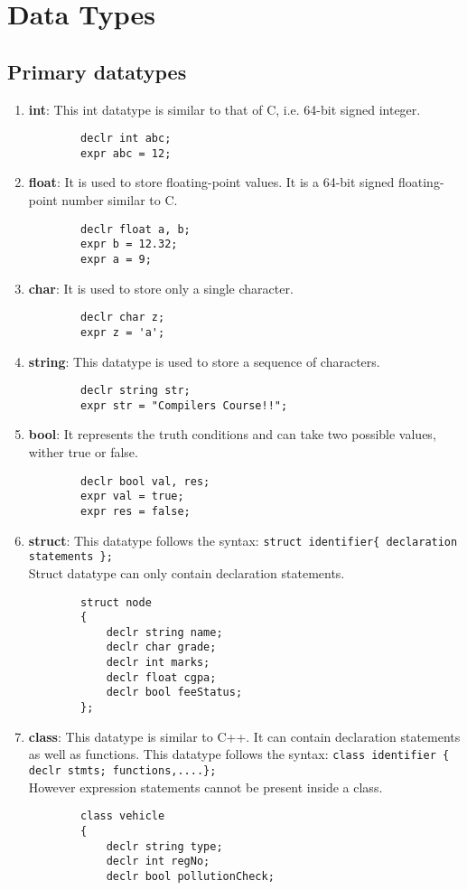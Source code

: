 \documentclass[journal, 18pt]{report}
\begin{document}
\chapter{Data Types}

\section{Primary datatypes}
\begin{enumerate}
    \item \textbf{int}: This int datatype is similar to that of C, i.e. 64-bit signed integer.
    \begin{lstlisting}
        declr int abc;
        expr abc = 12;
    \end{lstlisting}
    \item \textbf{float}: It is used to store floating-point values. It is a 64-bit signed floating-point number similar to C.
    \begin{lstlisting}
        declr float a, b;
        expr b = 12.32;
        expr a = 9;
    \end{lstlisting}
    \item \textbf{char}: It is used to store only a single character.
    \begin{lstlisting}
        declr char z;
        expr z = 'a';
    \end{lstlisting}
    \item \textbf{string}: This datatype is used to store a sequence of characters.
    \begin{lstlisting}
        declr string str;
        expr str = "Compilers Course!!";
    \end{lstlisting}
    \item \textbf{bool}: It represents the truth conditions and can take two possible values, wither true or false.
    \begin{lstlisting}
        declr bool val, res;
        expr val = true;
        expr res = false;
    \end{lstlisting}
    \item \textbf{struct}: This datatype follows the syntax: \texttt{struct identifier\{ declaration statements \}; }\\
    Struct datatype can only contain declaration statements.\\
    \begin{lstlisting}
        struct node
        {
            declr string name;
            declr char grade;
            declr int marks;
            declr float cgpa;
            declr bool feeStatus;
        };
    \end{lstlisting}
    \item \textbf{class}: This datatype is similar to C++. It can contain declaration statements as well as functions. This datatype follows the syntax: \texttt{class identifier \{ declr stmts; functions,....\}; }\\
    However expression statements cannot be present inside a class.\\
    \begin{lstlisting}
        class vehicle
        {
            declr string type;
            declr int regNo;
            declr bool pollutionCheck;


\end{lstlisting}
\end{enumerate}
\end{document}
